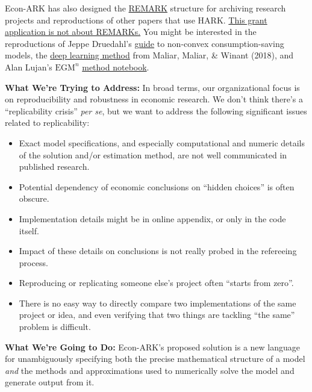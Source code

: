 \documentclass[12pt,pdftex,letterpaper]{article}
\begin{document}
\noindent Econ-ARK has also designed the \href{https://github.com/econ-ark/REMARK}{REMARK} structure for archiving research projects and reproductions of other papers that use HARK. \underline{This grant application is not about REMARKs.} You might be interested in the reproductions of Jeppe Druedahl's \href{https://econ-ark.org/materials/durableconsumertype/}{guide} to non-convex consumption-saving models, the \href{https://econ-ark.org/materials/deep-learning-euler-method-krusell-smith/}{deep learning method} from Maliar, Maliar, \& Winant (2018), and Alan Lujan's $\text{EGM}^n$ \href{https://econ-ark.org/materials/sequentialegm/}{method notebook}.

\vspace{0.5cm}

\noindent \textbf{What We're Trying to Address:} In broad terms, our organizational focus is on reproducibility and robustness in economic research. We don't think there's a ``replicability crisis'' \textit{per se}, but we want to address the following significant issues related to replicability:

\begin{itemize}
	\item Exact model specifications, and especially computational and numeric details of the solution and/or estimation method, are not well communicated in published research.
	
	\item Potential dependency of economic conclusions on ``hidden choices'' is often obscure.
	
	\item Implementation details might be in online appendix, or only in the code itself.
	
	\item Impact of these details on conclusions is not really probed in the refereeing process.
	
	\item Reproducing or replicating someone else's project often ``starts from zero''.
	
	\item There is no easy way to directly compare two implementations of the same project or idea, and even verifying that two things are tackling ``the same'' problem is difficult.
\end{itemize}

\vspace{0.25cm}

\noindent \textbf{What We're Going to Do:} Econ-ARK's proposed solution is a new language for unambiguously specifying both the precise mathematical structure of a model \textit{and} the methods and approximations used to numerically solve the model and generate output from it.
\end{document}
